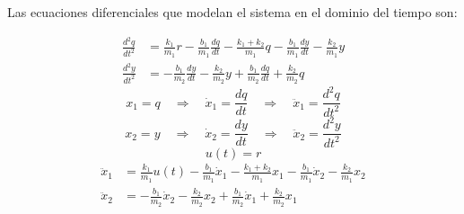 \documentclass{article}
\begin{document}
\begin{enumerate}
  Las ecuaciones diferenciales que modelan el sistema en el dominio del tiempo son:

  \begin{align}
    \frac{d^2q}{dt^2} &= \frac{k_1}{m_1}r - \frac{b_1}{m_1}\frac{dq}{dt} - \frac{k_1+k_2}{m_1}q - \frac{b_1}{m_1}\frac{dy}{dt} - \frac{k_2}{m_1}y\\
     \frac{d^2y}{dt^2} &= -\frac{b_1}{m_2}\frac{dy}{dt} - \frac{k_2}{m_2}y + \frac{b_1}{m_2}\frac{dq}{dt} + \frac{k_2}{m_2}q
  \end{align}
  \begin{equation*}
    x_1 = q \quad \Rightarrow \quad \dot{x}_1 = \frac{dq}{dt} \quad \Rightarrow \quad \ddot{x}_1 = \frac{d^2q}{dt^2}
  \end{equation*}
  \begin{equation*}
    x_2 = y \quad \Rightarrow \quad \dot{x}_2 = \frac{dy}{dt} \quad \Rightarrow \quad \ddot{x}_2 = \frac{d^2y}{dt^2}
  \end{equation*}
  \begin{equation*}
    u(t) = r
  \end{equation*}
  \begin{align}
    \ddot{x}_1 &= \frac{k_1}{m_1}u(t) - \frac{b_1}{m_1}\dot{x}_1 - \frac{k_1+k_2}{m_1}x_1 - \frac{b_1}{m_1}\dot{x}_2 - \frac{k_2}{m_1}x_2\\
     \ddot{x}_2 &= -\frac{b_1}{m_2}\dot{x}_2 - \frac{k_2}{m_2}x_2 + \frac{b_1}{m_2}\dot{x}_1 + \frac{k_2}{m_2}x_1
  \end{align}


\end{enumerate}
\end{document}
